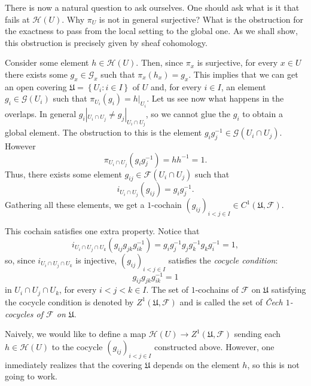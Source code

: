 \documentclass[12pt,a4paper]{article}
\begin{document}
    There is now a natural question to ask ourselves. One should ask what is it that fails at $\mathcal{H}(U)$. Why $\pi_U$ is not in general surjective? What is the obstruction for the exactness to pass from the local setting to the global one. As we shall show, this obstruction is precisely given by sheaf cohomology.

    Consider some element $h\in \mathcal{H}(U)$. Then, since $\pi_x$ is surjective, for every $x\in U$ there exists some $g_x \in \mathcal{G}_x$ such that $\pi_x(h_x)=g_x$. This implies that we can get an open covering $\mathfrak{U}=\left\{ U_i: i \in I \right\}$ of $U$ and, for every $i \in I$, an element $g_i \in \mathcal{G}(U_i)$ such that $\pi_{U_i}(g_i)=h|_{U_i}$. Let us see now what happens in the overlaps. In general $g_i|_{U_i\cap U_j} \neq g_j|_{U_i\cap U_j}$, so we cannot glue the $g_i$ to obtain a global element. The obstruction to this is the element $g_i g_j^{-1} \in \mathcal{G}(U_i \cap U_j)$. However
    \begin{equation*}
      \pi_{U_i \cap U_j}(g_ig_j^{-1})=hh^{-1} = 1.
    \end{equation*}
    Thus, there exists some element $g_{ij} \in \mathcal{F}(U_i\cap U_j)$ such that $$i_{U_i\cap U_j}(g_{ij})=g_ig_j^{-1}.$$
    Gathering all these elements, we get a $1$-cochain $(g_{ij})_{i<j\in I} \in C^1(\mathfrak{U},\mathcal{F})$.
    
    This cochain satisfies one extra property. Notice that
    \begin{equation*}
      i_{U_i\cap U_j\cap U_k}(g_{ij} g_{jk} g_{ik}^{-1})=g_i g_j^{-1} g_j g_k^{-1} g_k g_i^{-1}= 1,
    \end{equation*}
    so, since $i_{U_i \cap U_j \cap U_k}$ is injective, $(g_{ij})_{i<j \in I}$ satisfies the \emph{cocycle condition}:
    \begin{equation*}
      g_{ij} g_{jk} g_{ik}^{-1} = 1
    \end{equation*}
    in $U_i\cap U_j \cap U_k$, for every $i<j<k \in I$. The set of $1$-cochains of $\mathcal{F}$ on $\mathfrak{U}$ satisfying the cocycle condition is denoted by $Z^1(\mathfrak{U},\mathcal{F})$ and is called the set of \emph{\v{C}ech $1$-cocycles of $\mathcal{F}$ on $\mathfrak{U}$}. 

    Naively, we would like to define a map $\mathcal{H}(U) \rightarrow Z^1(\mathfrak{U},\mathcal{F})$ sending each $h\in \mathcal{H}(U)$ to the cocycle $(g_{ij})_{i<j \in I}$ constructed above. However, one inmediately realizes that the covering $\mathfrak{U}$ depends on the element $h$, so this is not going to work.
\end{document}
